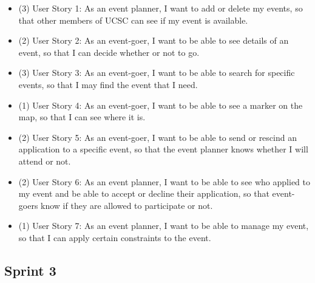 \documentclass[10pt]{article}
\newcommand{\fancysubX}[2] {{\color{primary}\subsection*{#1} \label{sec:#2}}}
\begin{document}
        \begin{itemize}
            \item (3) User Story 1: As an event planner, I want to add or delete my events, so that other members of UCSC can see if my event is available.
	    \item (2) User Story 2: As an event-goer, I want to be able to see details of an event, so that I can decide whether or not to go.
	    \item (3) User Story 3: As an event-goer, I want to be able to search for specific events, so that I may find the event that I need.
	    \item (1) User Story 4: As an event-goer, I want to be able to see a marker on the map, so that I can see where it is.
	    \item (2) User Story 5: As an event-goer, I want to be able to send or rescind an application to a specific event, so that the event planner knows whether I will attend or not.
	    \item (2) User Story 6: As an event planner, I want to be able to see who applied to my event and be able to accept or decline their application, so that event-goers know if they are allowed to participate or not.
	    \item (1) User Story 7: As an event planner, I want to be able to manage my event, so that I can apply certain constraints to the event.
        \end{itemize}
         
    \fancysubX{Sprint 3}{sprint3}
     
\end{document}
